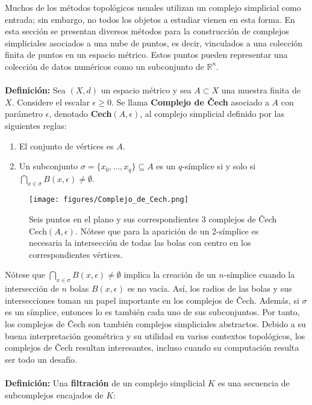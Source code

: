 \documentclass[a4paper,11pt]{article}
\begin{document}
Muchos de los métodos topológicos usuales utilizan un complejo simplicial como entrada; sin embargo, no todos los objetos a estudiar vienen en esta forma. En esta sección se presentan diversos métodos para la construcción de complejos simpliciales asociados a una nube de puntos, es decir, vinculados a una colección finita de puntos en un espacio métrico. Estos puntos pueden representar una colección de datos numéricos como un subconjunto de $\mathbb{R}^n$.\\
\\
\textbf{Definición:} Sea $(X, d)$ un espacio métrico y sea $A \subset X$ una muestra finita de $X$. Considere el escalar $\epsilon \geq 0$. Se llama \textbf{Complejo de Čech} asociado a $A$ con parámetro $\epsilon$, denotado \textbf{Cech$(A, \epsilon)$}, al complejo simplicial definido por las siguientes reglas:
\begin{enumerate}
    \item El conjunto de vértices es $A$.
    \item Un subconjunto $\sigma = \{x_{0}, \ldots, x_{q}\} \subseteq A$ es un $q$-símplice si y solo si $\bigcap_{x \in \sigma} B(x, \epsilon) \neq \emptyset$.
\end{enumerate}
\begin{figure}[!htb]
  \centering
  \texttt{[image: figures/Complejo\_de\_Cech.png]}
  \caption{Seis puntos en el plano y sus correspondientes 3 complejos de Čech Cech$(A, \epsilon)$. Nótese que para la aparición de un 2-símplice es necesaria la intersección de todas las bolas con centro en los correspondientes vértices.}
\end{figure}
Nótese que $\bigcap_{x\in \sigma}B(x,\epsilon )\neq \emptyset$ implica la creación de un $n$-símplice cuando la intersección de $n$ bolas $B(x,\epsilon )$ es no vacía. Así, los radios de las bolas y sus intersecciones toman un papel importante en los complejos de Čech. Además, si $\sigma$ es un símplice, entonces lo es también cada uno de sus subconjuntos. Por tanto, los complejos de Čech son también complejos simpliciales abstractos. Debido a su buena interpretación geométrica y su utilidad en varios contextos topológicos, los complejos de Čech resultan interesantes, incluso cuando su computación resulta ser todo un desafío.\\
\\
\textbf{Definición:} Una \textbf{filtración} de un complejo simplicial $K$ es una secuencia de subcomplejos encajados de $K$: 
\end{document}

